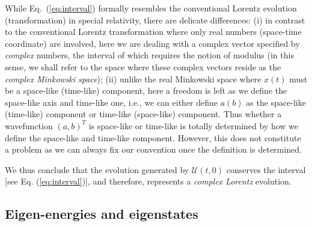 \documentclass[pra,epsfig,rotate,superscriptaddress,showpacs]{revtex4}
\begin{document}
While Eq.~(\ref{eq:interval}) formally resembles the conventional Lorentz evolution (transformation) in special relativity, there are delicate differences: (i) in contrast to the conventional Lorentz
transformation where only real numbers (space-time coordinate) are involved, here we are dealing with a complex vector specified by \textit{complex} numbers, the interval of which requires the notion of modulus (in this sense, we shall refer to the space where these complex vectors reside as the {\it complex Minkowski space}); (ii) unlike the real Minkowski space where $x(t)$ must be a space-like (time-like) component, here a freedom is left as we define the space-like axis and time-like one, i.e., we can either define $a(b)$ as the space-like (time-like) component or time-like (space-like) component. Thus whether a wavefunction $(a,b)^T$ is space-like or time-like is totally determined by how we define the space-like and time-like component. However, this does not constitute a problem as we can always fix our convention once the definition is determined.

We thus conclude that the evolution generated by $\mathcal{U}(t,0)$ conserves the interval [see Eq. (\ref{eq:interval})], and therefore, represents a \textit{complex Lorentz} evolution.

\subsection{Eigen-energies and eigenstates}
\end{document}
